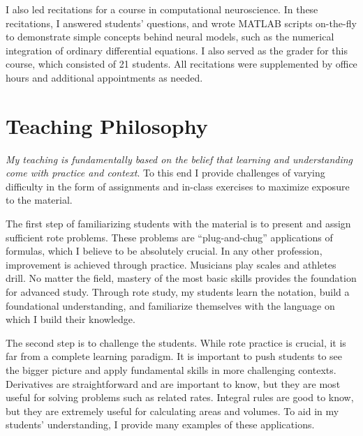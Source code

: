 \documentclass[a4paper,11pt]{article}
\begin{document}
I also led recitations for a course in computational neuroscience. In these recitations, I answered students' questions, and wrote MATLAB scripts on-the-fly to demonstrate simple concepts behind neural models, such as the numerical integration of ordinary differential equations. I also served as the grader for this course, which consisted of 21 students. All recitations were supplemented by office hours and additional appointments as needed.




\section{Teaching Philosophy}

\textit{My teaching is fundamentally based on the belief that learning and understanding come with practice and context}. To this end I provide challenges of varying difficulty in the form of assignments and in-class exercises to maximize exposure to the material.


The first step of familiarizing students with the material is to present and assign sufficient rote problems. These problems are ``plug-and-chug'' applications of formulas, which I believe to be absolutely crucial. In any other profession, improvement is achieved through practice. Musicians play scales and athletes drill. No matter the field, mastery of the most basic skills provides the foundation for advanced study. Through rote study, my students learn the notation, build a foundational understanding, and familiarize themselves with the language on which I build their knowledge.

The second step is to challenge the students. While rote practice is crucial, it is far from a complete learning paradigm. It is important to push students to see the bigger picture and apply fundamental skills in more challenging contexts. Derivatives are straightforward and are important to know, but they are most useful for solving problems such as related rates. Integral rules are good to know, but they are extremely useful for calculating areas and volumes. To aid in my students' understanding, I provide many examples of these applications.
\end{document}

